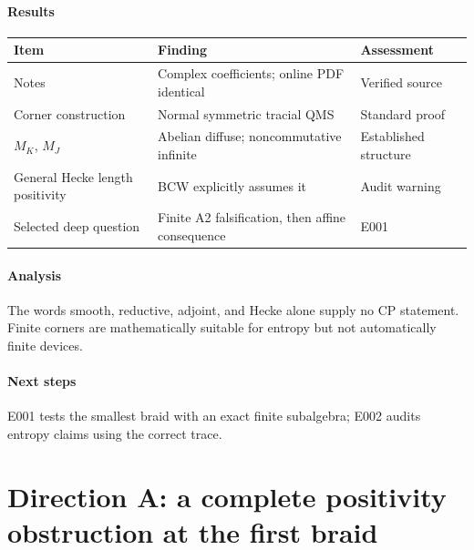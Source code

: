 \documentclass[11pt]{article}
\theoremstyle{remark}\newtheorem{remark}[definition]{Remark}
\begin{document}
\paragraph{Results}
{\setlength{\tabcolsep}{8pt}\renewcommand{\arraystretch}{1.2}
\begin{tabular}{p{.22\linewidth}p{.45\linewidth}p{.20\linewidth}}\toprule
Item & Finding & Assessment\\\midrule
Notes & Complex coefficients; online PDF identical & Verified source\\
Corner construction & Normal symmetric tracial QMS & Standard proof\\
$M_K$, $M_J$ & Abelian diffuse; noncommutative infinite & Established structure\\
General Hecke length positivity & BCW explicitly assumes it & Audit warning\\
Selected deep question & Finite A2 falsification, then affine consequence & E001\\\bottomrule
\end{tabular}}
\paragraph{Analysis} The words smooth, reductive, adjoint, and Hecke alone
supply no CP statement. Finite corners are mathematically suitable for
entropy but not automatically finite devices.
\paragraph{Next steps} E001 tests the smallest braid with an exact finite
subalgebra; E002 audits entropy claims using the correct trace.

\section{Direction A: a complete positivity obstruction at the first braid}
\end{document}
